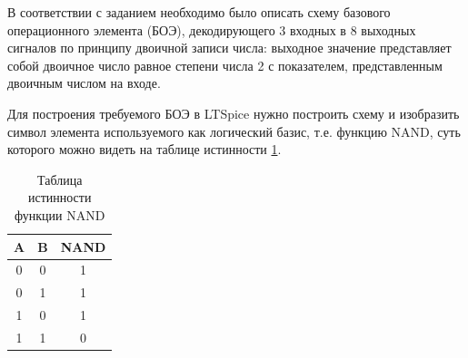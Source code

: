 \newpage
{}

В соответствии с заданием необходимо было описать схему базового операционного
элемента (БОЭ), декодирующего 3 входных в 8 выходных сигналов по принципу
двоичной записи числа: выходное значение представляет собой двоичное число
равное степени числа 2 с показателем, представленным двоичным числом на входе.


Для построения требуемого БОЭ в LTSpice нужно построить схему и изобразить
символ элемента используемого как логический базис, т.е. функцию NAND, суть
которого можно видеть на таблице истинности \ref{tab:nand}. 

\begin{table}[htb]
    \centering
    \begin{tabular}{|c|c|c|}\hline
        A & B & NAND\\\hline
        0 & 0 & 1   \\
        0 & 1 & 1   \\
        1 & 0 & 1   \\
        1 & 1 & 0   \\\hline
    \end{tabular}
    \caption{Таблица истинности функции NAND}
    \label{tab:nand}
\end{table}

